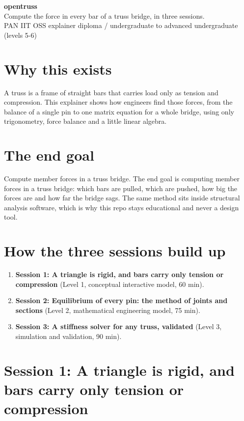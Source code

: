 \documentclass[11pt,a4paper]{article}
\begin{document}
\begin{center}{\LARGE\bfseries opentruss}\\[0.4em]{\large Compute the force in every bar of a truss bridge, in three sessions.}\\[0.2em]\small PAN IIT OSS explainer \textbullet{} diploma / undergraduate to advanced undergraduate (levels 5-6)\end{center}

\section*{Why this exists}
A truss is a frame of straight bars that carries load only as tension and compression. This explainer shows how engineers find those forces, from the balance of a single pin to one matrix equation for a whole bridge, using only trigonometry, force balance and a little linear algebra.

\section*{The end goal}
Compute member forces in a truss bridge. The end goal is computing member forces in a truss bridge: which bars are pulled, which are pushed, how big the forces are and how far the bridge sags. The same method sits inside structural analysis software, which is why this repo stays educational and never a design tool.

\section*{How the three sessions build up}
\begin{enumerate}[nosep]
\item \textbf{Session 1: A triangle is rigid, and bars carry only tension or compression} (Level 1, conceptual interactive model, 60 min).
\item \textbf{Session 2: Equilibrium of every pin: the method of joints and sections} (Level 2, mathematical engineering model, 75 min).
\item \textbf{Session 3: A stiffness solver for any truss, validated} (Level 3, simulation and validation, 90 min).
\end{enumerate}

\section{Session 1: A triangle is rigid, and bars carry only tension or compression}
\end{document}
